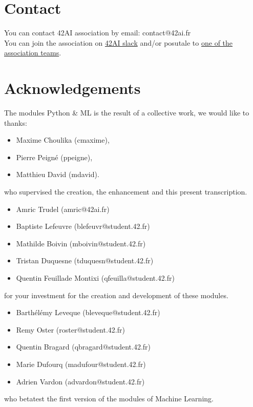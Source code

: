 \documentclass{42-en}
\begin{document}

\newpage

\section*{Contact}
You can contact 42AI association by email: contact@42ai.fr\\
You can join the association on \href{https://join.slack.com/t/42-ai/shared_invite/zt-ebccw5r7-YPkDM6xOiYRPjqJXkrKgcA}{42AI slack}
and/or posutale to \href{https://forms.gle/VAFuREWaLmaqZw2D8}{one of the association teams}.

\section*{Acknowledgements}
The modules Python \& ML is the result of a collective work, we would like to thanks:
\begin{itemize}
  \item Maxime Choulika (cmaxime),
  \item Pierre Peigné (ppeigne),
  \item Matthieu David (mdavid).
\end{itemize}
who supervised the creation, the enhancement and this present transcription.

\begin{itemize}
    \item Amric Trudel (amric@42ai.fr)
    \item Baptiste Lefeuvre (blefeuvr@student.42.fr)
    \item Mathilde Boivin (mboivin@student.42.fr)
    \item Tristan Duquesne (tduquesn@student.42.fr)
    \item Quentin Feuillade Montixi (qfeuilla@student.42.fr)
\end{itemize}
for your investment for the creation and development of these modules.

\begin{itemize}
    \item Barthélémy Leveque (bleveque@student.42.fr)
    \item Remy Oster (roster@student.42.fr)
    \item Quentin Bragard (qbragard@student.42.fr)
    \item Marie Dufourq (madufour@student.42.fr)
    \item Adrien Vardon (advardon@student.42.fr)
\end{itemize}
who betatest the first version of the modules of Machine Learning.
\vfill
\doclicenseThis
\end{document}
